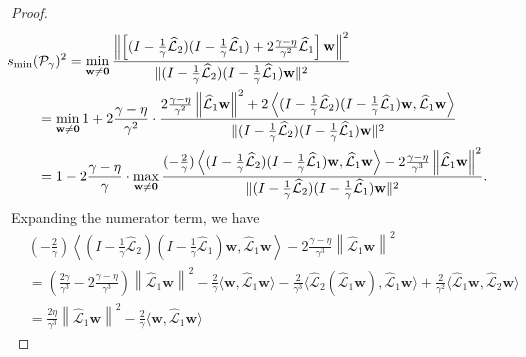 \documentclass[a4paper,10pt]{article}
\begin{document}
\begin{proof}
{\begin{align}
& \hspace{-5ex}
s_{\min}(\mathcal{P}_\gamma)^2 = 
	\min_{\mathbf{w}\neq\mathbf{0}}
	\frac{\left\| \left[(I - \tfrac{1}{\gamma}\widehat{\mathcal{L}}_2)(I - \tfrac{1}{\gamma}\widehat{\mathcal{L}}_1)
		+ 2\frac{\gamma-\eta}{\gamma^2}\widehat{\mathcal{L}}_1\right]\mathbf{w} \right\|^2}
	{\|(I - \tfrac{1}{\gamma}\widehat{\mathcal{L}}_2)(I - \tfrac{1}{\gamma}\widehat{\mathcal{L}}_1)\mathbf{w}\|^2} \nonumber\\
& = \min_{\mathbf{w}\neq\mathbf{0}} 1 +
	2\frac{\gamma-\eta}{\gamma^2}\cdot 
	\frac{2\frac{\gamma-\eta}{\gamma^2}\left\|\widehat{\mathcal{L}}_1\mathbf{w} \right\|^2
		+ 2\left\langle(I - \tfrac{1}{\gamma}\widehat{\mathcal{L}}_2)(I - \tfrac{1}{\gamma}\widehat{\mathcal{L}}_1)\mathbf{w},
		\widehat{\mathcal{L}}_1\mathbf{w} \right\rangle}
	{\|(I - \tfrac{1}{\gamma}\widehat{\mathcal{L}}_2)(I - \tfrac{1}{\gamma}\widehat{\mathcal{L}}_1)\mathbf{w}\|^2} \nonumber\\
& = 1 - 2\frac{\gamma-\eta}{\gamma} \cdot\max_{\mathbf{w}\neq\mathbf{0}}
	\frac{(-\tfrac{2}{\gamma})\left\langle(I - \tfrac{1}{\gamma}\widehat{\mathcal{L}}_2)(I -
		\tfrac{1}{\gamma}\widehat{\mathcal{L}}_1)\mathbf{w},
		\widehat{\mathcal{L}}_1\mathbf{w} \right\rangle- 
		2\frac{\gamma-\eta}{\gamma^3}\left\|\widehat{\mathcal{L}}_1\mathbf{w} \right\|^2}
	{\|(I - \tfrac{1}{\gamma}\widehat{\mathcal{L}}_2)(I - \tfrac{1}{\gamma}\widehat{\mathcal{L}}_1)\mathbf{w}\|^2}.
	\label{eq:gen_smin}
\end{align}
}
%
Expanding the numerator term, we have
{
\begin{align}\nonumber
& (-\tfrac{2}{\gamma})\left\langle(I - \tfrac{1}{\gamma}\widehat{\mathcal{L}}_2)(I - \tfrac{1}{\gamma}\widehat{\mathcal{L}}_1)\mathbf{w},
		\widehat{\mathcal{L}}_1\mathbf{w} \right\rangle- 
		2\frac{\gamma-\eta}{\gamma^3}\left\|\widehat{\mathcal{L}}_1\mathbf{w} \right\|^2 \\
& = \left(\frac{2\gamma}{\gamma^3} - 2\frac{\gamma-\eta}{\gamma^3}\right)
			\left\|\widehat{\mathcal{L}}_1\mathbf{w} \right\|^2
		- \tfrac{2}{\gamma}\langle\mathbf{w},\widehat{\mathcal{L}}_1\mathbf{w}\rangle
		- \frac{2}{\gamma^3}\langle\widehat{\mathcal{L}}_2(\widehat{\mathcal{L}}_1\mathbf{w}),\widehat{\mathcal{L}}_1\mathbf{w}\rangle
		+ \frac{2}{\gamma^2}\langle\widehat{\mathcal{L}}_1\mathbf{w},\widehat{\mathcal{L}}_2\mathbf{w}\rangle \nonumber\\
& = \frac{2\eta}{\gamma^3}
			\left\|\widehat{\mathcal{L}}_1\mathbf{w} \right\|^2
		- \frac{2}{\gamma}\langle\mathbf{w},\widehat{\mathcal{L}}_1\mathbf{w}\rangle

\end{align}}
\end{proof}
\end{document}
